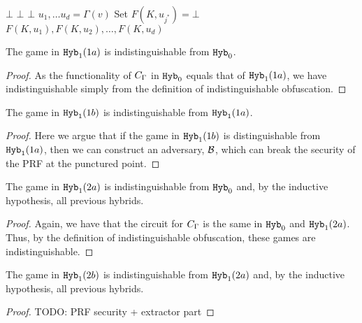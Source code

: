 \begin{algorithm}[H]
	\caption{
		Circuit for the neighbor function, $\circNeigb$ with punctured PRF key
		$K(S)$ and constant $w^*, Y^*, J^*, z^*$%
	}
	\begin{algorithmic}[1]
				\State \Return $\bot$
			\EndIf
				\State \Return $\bot$ 
			\EndIf
				\State \Return $\bot$
			\EndIf
			\State $u_1, \dots u_d = \Gamma(v)$
			 	\State Set $F(K, u_{j^*}) = \bot$
			\EndIf
			\State \Return $F(K, u_1), F(K, u_2), \dots, F(K, u_d)$
		\EndFunction
	\end{algorithmic}
	\label{alg:neighbHyb2}
\end{algorithm}

	\begin{lemma}
		The game in $\texttt{Hyb}_1 (1a)$ is indistinguishable from $\texttt{Hyb}_0$.
		\begin{proof}
			As the functionality of $\circNeigb$ in $\texttt{Hyb}_0$ equals that of $\texttt{Hyb}_1 (1a)$,
			we have indistinguishable simply from the definition of indistinguishable obfuscation.
		\end{proof}
	\end{lemma}

	\begin{lemma}
		The game in $\texttt{Hyb}_1 (1b)$ is indistinguishable from $\texttt{Hyb}_1 (1a)$.
		\begin{proof}
			Here we argue that if the game in $\texttt{Hyb}_1 (1b)$ is distinguishable from
			$\texttt{Hyb}_1 (1a)$, then we can construct an adversary, $\mathcal{B}$, which can break the security of the PRF
			at the punctured point. 


		\end{proof}
	\end{lemma}

	\begin{lemma}
		The game in $\texttt{Hyb}_1 (2a)$ is indistinguishable from $\texttt{Hyb}_0$ and, by the inductive hypothesis, all previous hybrids.
		\begin{proof}
			Again, we have that the circuit for $\circNeigb$ is the same in $\texttt{Hyb}_0$ and $\texttt{Hyb}_1 (2a)$.
			Thus, by the definition of indistinguishable obfuscation, these games are indistinguishable.
		\end{proof}
	\end{lemma}

	\begin{lemma}
		The game in $\texttt{Hyb}_1 (2b)$ is indistinguishable from $\texttt{Hyb}_1 (2a)$ and, by the inductive hypothesis, all previous hybrids.
		\begin{proof}
			TODO: PRF security + extractor part
		\end{proof}
	\end{lemma}

	